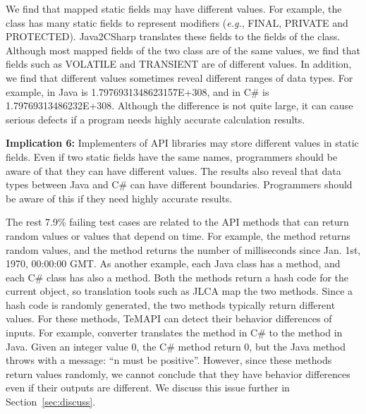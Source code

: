 We find that mapped static fields may have different values. For example, the  class has many static fields to represent modifiers (\emph{e.g.}, FINAL, PRIVATE and PROTECTED). Java2CSharp translates these fields to the fields of the  class. Although most mapped fields of the two class are of the same values, we find that fields such as VOLATILE and TRANSIENT are of different values. In addition, we find that different values sometimes reveal different ranges of data types. For example,  in Java is 1.7976931348623157E+308, and  in C\# is 1.79769313486232E+308.  Although the difference is not quite large, it can cause serious defects if a program needs highly accurate calculation results.

\textbf{Implication 6:} Implementers of API libraries may store different values in static fields. Even if two static fields have the same names, programmers should be aware of that they can have different values. The results also reveal that data types between Java and C\# can have different boundaries. Programmers should be aware of this if they need highly accurate results.

The rest 7.9\% failing test cases are related to the API methods that can return random values or values that depend on time. For example, the  method returns random values, and the  method returns the number of milliseconds since Jan. 1st, 1970, 00:00:00 GMT. As another example, each Java class has a  method, and each C\# class has also a  method. Both the methods return a hash code for the current object, so translation tools such as JLCA map the two methods. Since a hash code is randomly generated, the two methods typically return different values. For these methods, TeMAPI can detect their behavior differences of inputs. For example, converter translates the  method in C\# to the  method in Java. Given an integer value 0, the C\# method return 0, but the Java method throws  with a message: ``n must be positive''. However, since these methods return values randomly, we cannot conclude that they have behavior differences even if their outputs are different. We discuss this issue further in Section~\ref{sec:discuss}.

